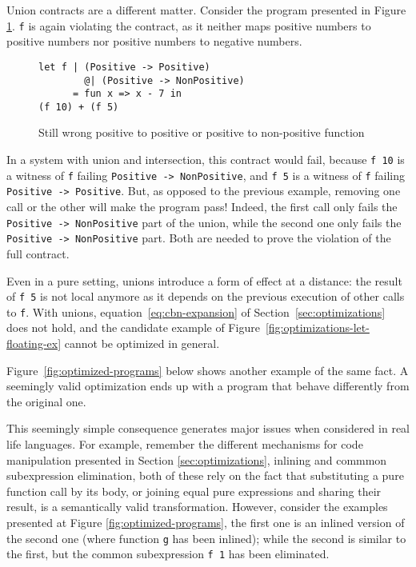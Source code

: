 \documentclass[sigplan,10pt,review,anonymous]{acmart}
\newcommand{\unsure}[2][1=]{}
\newcommand{\nickel}[1]{\lstinline[language=nickel]{#1}}
\begin{document}
Union contracts are a different matter. Consider the program presented in
Figure \ref{fig:wrong-union-function}. \nickel{f} is again violating the
contract, as it neither maps positive numbers to positive numbers nor positive
numbers to negative numbers.

\begin{figure}[h]
\begin{lstlisting}[language=nickel]
let f | (Positive -> Positive)
        @| (Positive -> NonPositive)
      = fun x => x - 7 in
(f 10) + (f 5)
\end{lstlisting}
\caption{Still wrong positive to positive or positive to non-positive function}
\label{fig:wrong-union-function}
\end{figure}

In a system with union and intersection, this contract would fail, because
\nickel{f 10} is a witness of \nickel{f} failing \nickel{Positive -> NonPositive},
and \nickel{f 5} is a witness of \nickel{f} failing \nickel{Positive -> Positive}.
But, as opposed to the previous example, removing one call or the other will make the program pass!
Indeed, the first call only fails the \nickel{Positive -> NonPositive} part of
the union,
while the second one only fails the \nickel{Positive -> NonPositive} part. Both
are needed to prove the violation of the full contract.

Even in a pure setting, unions introduce a form of effect at a distance: the
result of \nickel{f 5} is not local anymore as it depends on the previous
execution of other calls to \nickel{f}. With unions,
equation~\ref{eq:cbn-expansion} of Section~\ref{sec:optimizations} does not
hold, and the candidate example of
Figure~\ref{fig:optimizations-let-floating-ex} cannot be optimized in general.

Figure~\ref{fig:optimized-programs} below shows another example of the same
fact. A seemingly valid optimization ends up with a program that behave
differently from the original one.

\unsure{WARNING: what is below is being reworked by Yann}

This seemingly simple consequence generates major issues when considered in real
life languages.
For example, remember the different mechanisms for code manipulation presented
in Section \ref{sec:optimizations}, inlining and commmon subexpression elimination,
both of these rely on the fact that substituting a pure function call by its body,
or joining equal pure expressions and sharing their result, is a semantically valid
transformation.
However, consider the examples presented at Figure \ref{fig:optimized-programs},
the first one is an inlined version of the second one (where function
\nickel{g} has been inlined); while the second is similar to the first, but
the common subexpression \nickel{f 1} has been eliminated.
\end{document}
